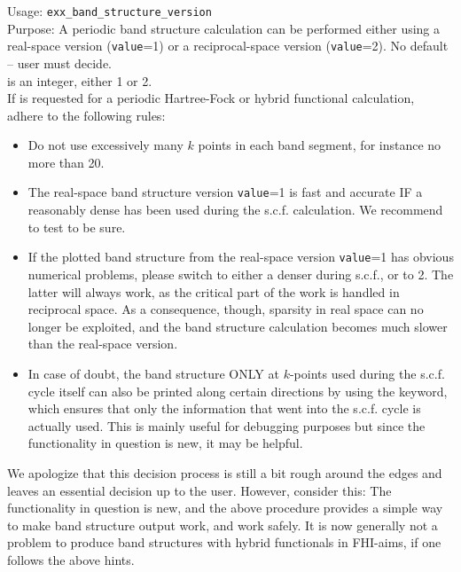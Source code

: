 { \noindent
  Usage: \texttt{exx\_band\_structure\_version} 
  \\[1.0ex]
  Purpose: A periodic band structure calculation can be performed
    either using a real-space version (\texttt{value}=1) or a
    reciprocal-space version (\texttt{value}=2). No default -- user
    must decide. \\[1.0ex]
   is an integer, either 1 or 2. \\
}
If   is requested for a periodic Hartree-Fock
or hybrid functional calculation, adhere to the following rules:
\begin{itemize}
  \item Do not use excessively many $k$ points in each band segment,
    for instance no more than 20. 
  \item The real-space band structure version \texttt{value}=1 is fast
    and accurate IF a reasonably dense  has been used
    during the s.c.f. calculation. We recommend to test to be sure.
  \item If the plotted band structure from the real-space version
    \texttt{value}=1 has obvious numerical problems, please switch to
    either a denser  during s.c.f., or to
     2. The latter will always
    work, as the critical part of the work is handled in reciprocal
    space. As a consequence, though, sparsity in real space can no
    longer be exploited, and the band structure calculation becomes
    much slower than the real-space version.
  \item In case of doubt, the band structure ONLY at $k$-points used
    during the s.c.f. cycle itself can also be printed along certain
    directions by using the  
     keyword, which ensures that
    only the information that went into the s.c.f. cycle is actually
    used. This is mainly useful for debugging purposes but since the
    functionality in question is new, it may be helpful.
\end{itemize}
We apologize that this decision process is still a bit rough around
the edges and leaves an essential decision up to the user. However,
consider this: The functionality in question is new, and the above
procedure provides a simple way to make band structure output work,
and work safely. It is now generally not a problem to produce band 
structures with hybrid functionals in FHI-aims, if one follows the
above hints.

